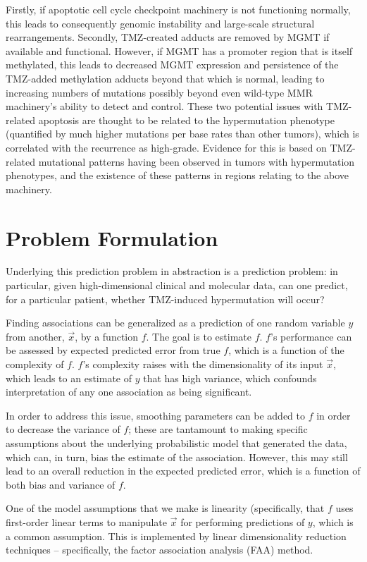 Firstly, if apoptotic cell cycle checkpoint machinery is not functioning normally, this leads to consequently genomic instability and large-scale structural rearrangements.  Secondly, TMZ-created adducts are removed by MGMT if available and functional. However, if MGMT has a promoter region that is itself methylated, this leads to decreased MGMT expression and persistence of the TMZ-added methylation adducts beyond that which is normal, leading to increasing numbers of mutations possibly beyond even wild-type MMR machinery’s ability to detect and control. 
These two potential issues with TMZ-related apoptosis are thought to be related to the hypermutation phenotype (quantified by much higher mutations per base rates than other tumors), which is correlated with the recurrence as high-grade. Evidence for this is based on TMZ-related mutational patterns having been observed in tumors with hypermutation phenotypes, and the existence of these patterns in regions relating to the above machinery.

\section{Problem Formulation}

Underlying this prediction problem in abstraction is a prediction problem: in particular, given high-dimensional clinical and molecular data, can one predict, for a particular patient, whether TMZ-induced hypermutation will occur?


Finding associations can be generalized as a prediction of one random variable $y$ from another, $\vec{x}$, by a function $f$. The goal is to estimate $f$. $f$'s performance can be assessed by expected predicted error from true $f$, which is a function of the complexity of $f$. $f$'s complexity raises with the dimensionality of its input $\vec{x}$, which leads to an estimate of $y$ that has high variance, which confounds interpretation of any one association as being significant.

In order to address this issue, smoothing parameters can be added to $f$ in order to decrease the variance of $f$; these are tantamount to making specific assumptions about the underlying probabilistic model that generated the data, which can, in turn, bias the estimate of the 
association. However, this may still lead to an overall reduction in the expected predicted error, which is a function of both bias and variance of $f$.


One of the model assumptions that we make is linearity (specifically, that $f$ uses first-order linear terms to manipulate $\vec{x}$ for performing predictions of $y$, which is a common assumption. This is implemented by linear dimensionality reduction techniques – specifically, the factor association analysis (FAA) method.

